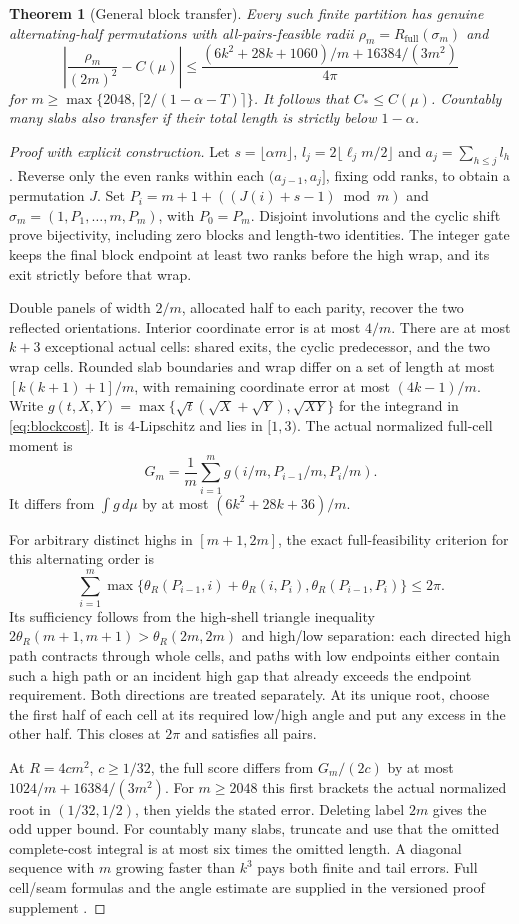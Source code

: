 \documentclass[11pt]{article}
\newtheorem{theorem}{Theorem}
\theoremstyle{definition}\newtheorem{definition}[theorem]{Definition}
\theoremstyle{remark}\newtheorem{remark}[theorem]{Remark}
\newcommand{\full}{R_{\mathrm{full}}}
\newcommand{\CC}{C_\ast}
\begin{document}
\begin{theorem}[General block transfer]\label{thm:blocks}
Every such finite partition has genuine alternating-half permutations with
all-pairs-feasible radii $\rho_m=\full(\sigma_m)$ and
\[
 \left|\frac{\rho_m}{(2m)^2}-C(\mu)\right|
 \le\frac{(6k^2+28k+1060)/m+16384/(3m^2)}{4\pi}
\]
for $m\ge\max\{2048,\lceil2/(1-\alpha-T)\rceil\}$.
It follows that $\CC\le C(\mu)$. Countably many slabs also transfer
if their total length is strictly below $1-\alpha$.
\end{theorem}
\begin{proof}[Proof with explicit construction]
Let $s=\lfloor\alpha m\rfloor$, $l_j=2\lfloor\ell_jm/2\rfloor$ and
$a_j=\sum_{h\le j}l_h$. Reverse only the even ranks within each
$(a_{j-1},a_j]$, fixing odd ranks, to obtain a permutation $J$.
Set $P_i=m+1+((J(i)+s-1)\bmod m)$ and
$\sigma_m=(1,P_1,\ldots,m,P_m)$, with $P_0=P_m$.
Disjoint involutions and the cyclic shift prove bijectivity, including
zero blocks and length-two identities. The integer gate keeps the final
block endpoint at least two ranks before the high wrap, and its exit
strictly before that wrap.

Double panels of width $2/m$, allocated half to each parity, recover
the two reflected orientations. Interior coordinate error is at most
$4/m$. There are at most $k+3$ exceptional actual cells: shared exits,
the cyclic predecessor, and the two wrap cells. Rounded slab boundaries
and wrap differ on a set of length at most $[k(k+1)+1]/m$, with remaining
coordinate error at most $(4k-1)/m$. Write
$g(t,X,Y)=\max\{\sqrt t(\sqrt X+\sqrt Y),\sqrt{XY}\}$ for the integrand
in \eqref{eq:blockcost}. It is $4$-Lipschitz and lies in $[1,3)$.
The actual normalized full-cell moment is
\[
 G_m=\frac1m\sum_{i=1}^m g(i/m,P_{i-1}/m,P_i/m).
\]
It differs from
$\int g\,d\mu$ by at most $(6k^2+28k+36)/m$.

For arbitrary distinct highs in $[m+1,2m]$, the exact full-feasibility
criterion for this alternating order is
\[
 \sum_{i=1}^m\max\{\theta_R(P_{i-1},i)+\theta_R(i,P_i),
                         \theta_R(P_{i-1},P_i)\}\le2\pi.
\]
Its sufficiency follows from the high-shell triangle inequality
$2\theta_R(m+1,m+1)>\theta_R(2m,2m)$ and high/low separation:
each directed high path contracts through whole cells, and paths with
low endpoints either contain such a high path or an incident high gap
that already exceeds the endpoint requirement. Both directions are
treated separately. At its unique root, choose the first half of each
cell at its required low/high angle and put any excess in the other half.
This closes at $2\pi$ and satisfies all pairs.

At $R=4cm^2$, $c\ge1/32$, the full score differs from $G_m/(2c)$ by
at most $1024/m+16384/(3m^2)$. For $m\ge2048$ this first brackets
the actual normalized root in $(1/32,1/2)$, then yields the stated error.
Deleting label $2m$ gives the odd upper bound. For countably many slabs,
truncate and use that the omitted complete-cost integral is at most six
times the omitted length. A diagonal sequence with $m$ growing faster
than $k^3$ pays both finite and tail errors. Full cell/seam formulas and
the angle estimate are supplied in the versioned proof supplement \cite{blocks}.
\end{proof}
\end{document}
